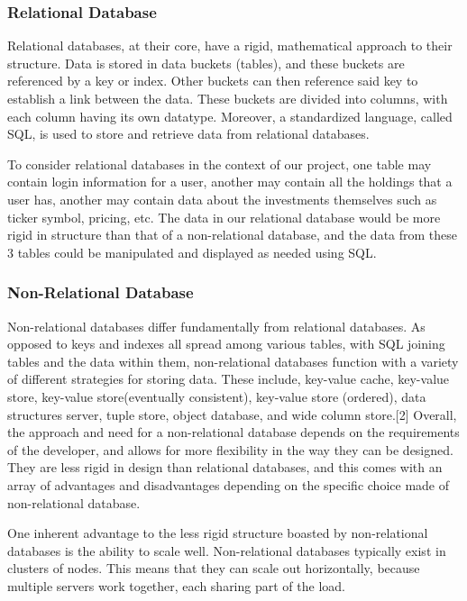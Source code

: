\documentclass[onecolumn, draftclsnofoot,10pt, compsoc]{IEEEtran}
\begin{document}
\subsubsection{Relational Database}
Relational databases, at their core, have a rigid, mathematical approach to their structure. Data is stored in data buckets (tables), and these buckets are referenced by a key or index. Other buckets can then reference said key to establish a link between the data. These buckets are divided into columns, with each column having its own datatype. Moreover, a standardized language, called SQL, is used to store and retrieve data from relational databases. 

To consider relational databases in the context of our project, one table may contain login information for a user, another may contain all the holdings that a user has, another may contain data about the investments themselves such as ticker symbol, pricing, etc. The data in our relational database would be more rigid in structure than that of a non-relational database, and the data from these 3 tables could be manipulated and displayed as needed using SQL.

\subsubsection{Non-Relational Database}
Non-relational databases differ fundamentally from relational databases. As opposed to keys and indexes all spread among various tables, with SQL joining tables and the data within them, non-relational databases function with a variety of different strategies for storing data. These include, key-value cache, key-value store, key-value store(eventually consistent), key-value store (ordered), data structures server, tuple store, object database, and wide column store.[2] Overall, the approach and need for a non-relational database depends on the requirements of the developer, and allows for more flexibility in the way they can be designed. They are less rigid in design than relational databases, and this comes with an array of advantages and disadvantages depending on the specific choice made of non-relational database.

One inherent advantage to the less rigid structure boasted by non-relational databases is the ability to scale well. Non-relational databases typically exist in clusters of nodes. This means that they can scale out horizontally, because multiple servers work together, each sharing part of the load. 
\end{document}
